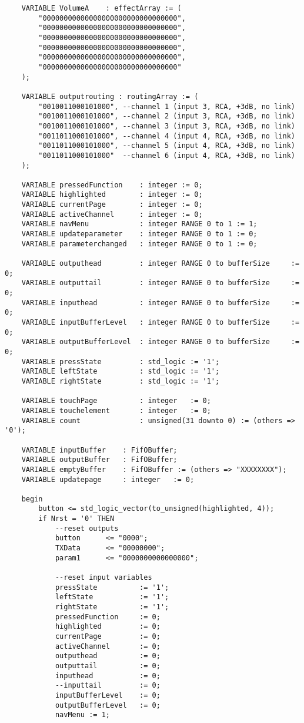 \begin{lstlisting}
	VARIABLE VolumeA	: effectArray := (
		"00000000000000000000000000000000",
		"00000000000000000000000000000000",
		"00000000000000000000000000000000",
		"00000000000000000000000000000000",
		"00000000000000000000000000000000",
		"00000000000000000000000000000000"
	);

	VARIABLE outputrouting : routingArray := (
		"0010011000101000",	--channel 1 (input 3, RCA, +3dB, no link)
		"0010011000101000",	--channel 2 (input 3, RCA, +3dB, no link)
		"0010011000101000",	--channel 3 (input 3, RCA, +3dB, no link)
		"0011011000101000",	--channel 4 (input 4, RCA, +3dB, no link)
		"0011011000101000",	--channel 5 (input 4, RCA, +3dB, no link)
		"0011011000101000"	--channel 6 (input 4, RCA, +3dB, no link)
	);

	VARIABLE pressedFunction 	: integer := 0;
	VARIABLE highlighted 		: integer := 0;
	VARIABLE currentPage 		: integer := 0;
	VARIABLE activeChannel		: integer := 0;
	VARIABLE navMenu			: integer RANGE 0 to 1 := 1;
	VARIABLE updateparameter	: integer RANGE 0 to 1 := 0;
	VARIABLE parameterchanged	: integer RANGE 0 to 1 := 0;
	
	VARIABLE outputhead			: integer RANGE 0 to bufferSize 	:= 0;
	VARIABLE outputtail			: integer RANGE 0 to bufferSize 	:= 0;
	VARIABLE inputhead			: integer RANGE 0 to bufferSize 	:= 0;
	VARIABLE inputBufferLevel 	: integer RANGE 0 to bufferSize 	:= 0;
	VARIABLE outputBufferLevel	: integer RANGE 0 to bufferSize 	:= 0;
	VARIABLE pressState 		: std_logic := '1';
	VARIABLE leftState 			: std_logic := '1';
	VARIABLE rightState 		: std_logic := '1';
	
	VARIABLE touchPage			: integer 	:= 0;
	VARIABLE touchelement		: integer 	:= 0;
	VARIABLE count				: unsigned(31 downto 0) := (others => '0');

	VARIABLE inputBuffer 	: FifOBuffer;
	VARIABLE outputBuffer	: FifOBuffer;
	VARIABLE emptyBuffer	: FifOBuffer := (others => "XXXXXXXX");
	VARIABLE updatepage		: integer	:= 0;
	
	begin
		button <= std_logic_vector(to_unsigned(highlighted, 4));
		if Nrst = '0' THEN
			--reset outputs
			button 		<= "0000";
			TXData 		<= "00000000";
			param1		<= "0000000000000000";
			
			--reset input variables
			pressState 			:= '1';
			leftState 			:= '1';
			rightState 			:= '1';
			pressedFunction 	:= 0;
			highlighted			:= 0;
			currentPage			:= 0;
			activeChannel		:= 0;
			outputhead			:= 0;
			outputtail			:= 0;
			inputhead			:= 0;
			--inputtail			:= 0;
			inputBufferLevel	:= 0;
			outputBufferLevel	:= 0;
			navMenu := 1;
			

\end{lstlisting}
